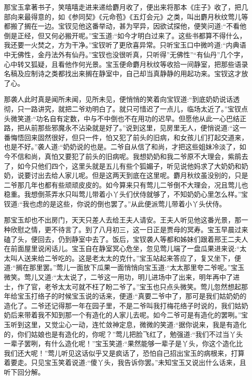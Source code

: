 \begin{parag}
    那宝玉拿著书子，笑嘻嘻走进来递给麝月收了，便出来将那本《庄子》收了，把几部向来最得意的，如《参同契》《元命苞》《五灯会元》之类，叫出麝月秋纹莺儿等都搬了搁在一边。宝钗见他这番举动，甚为罕异，因欲试探他，便笑问道:“不看他倒是正经，但又何必搬开呢。”宝玉道:“如今才明白过来了。这些书都算不得什么，我还要一火焚之，方为干净。”宝钗听了更欣喜异常。只听宝玉口中微吟道:“内典语中无佛性，金丹法外有仙丹。”宝钗也没很听真，只听得”无佛性”“有仙丹”几个字，心中转又狐疑，且看他作何光景。宝玉便命麝月秋纹等收拾一间静室，把那些语录名稿及应制诗之类都找出来搁在静室中，自己却当真静静的用起功来。宝钗这才放了心。
\end{parag}


\begin{parag}
    那袭人此时真是闻所未闻，见所未见，便悄悄的笑着向宝钗道:“到底奶奶说话透彻，只一路讲究，就把二爷劝明白了。就只可惜迟了一点儿，临场太近了。”宝钗点头微笑道:“功名自有定数，中与不中倒也不在用功的迟早。但愿他从此一心巴结正路，把从前那些邪魔永不沾染就是好了。”说到这里，见房里无人，便悄说道:“这一番悔悟回来固然很好，但只一件，怕又犯了前头的旧病，和女孩儿们打起交道来，也是不好。”袭人道:“奶奶说的也是。二爷自从信了和尚，才把这些姐妹冷淡了，如今不信和尚，真怕又要犯了前头的旧病呢。我想奶奶和我二爷原不大理会，紫鹃去了，如今只他们四个，这里头就是五儿有些个狐媚子，听见说他妈求了大奶奶和奶奶，说要讨出去给人家儿呢。但是这两天到底在这里呢。麝月秋纹虽没别的，只是二爷那几年也都有些顽顽皮皮的。如今算来只有莺儿二爷倒不大理会，况且莺儿也稳重。我想倒茶弄水只叫莺儿带着小丫头们伏侍就够了，不知奶奶心里怎么样。”宝钗道:“我也虑的是这些，你说的倒也罢了。”从此便派莺儿带着小丫头伏侍。
\end{parag}


\begin{parag}
    那宝玉却也不出房门，天天只差人去给王夫人请安。王夫人听见他这番光景，那一种欣慰之情，更不待言了。到了八月初三，这一日正是贾母的冥寿。宝玉早晨过来磕了头，便回去，仍到静室中去了。饭后，宝钗袭人等都和姊妹们跟着邢王二夫人在前面屋里说闲话儿。宝玉自在静室冥心危坐，忽见莺儿端了一盘瓜果进来说:“太太叫人送来给二爷吃的。这是老太太的克什。”宝玉站起来答应了，复又坐下，便道:“搁在那里罢。”莺儿一面放下瓜果一面悄悄向宝玉道:“太太那里夸二爷呢。”宝玉微笑。莺儿又道:“太太说了，二爷这一用功，明儿进场中了出来，明年再中了进士，作了官，老爷太太可就不枉了盼二爷了。”宝玉也只点头微笑。莺儿忽然想起那年给宝玉打络子的时候宝玉说的话来，便道:“真要二爷中了，那可是我们姑奶奶的造化了。二爷还记得那一年在园子里，不是二爷叫我打梅花络子时说的，我们姑奶奶后来带着我不知到那一个有造化的人家儿去呢。如今二爷可是有造化的罢咧。”宝玉听到这里，又觉尘心一动，连忙敛神定息，微微的笑道:“据你说来，我是有造化的，你们姑娘也是有造化的，你呢？”莺儿把脸飞红了，勉强道:“我们不过当丫头一辈子罢咧，有什么造化呢！”宝玉笑道:“果然能够一辈子是丫头，你这个造化比我们还大呢！”莺儿听见这话似乎又是疯话了，恐怕自己招出宝玉的病根来，打算着要走。只见宝玉笑着说道:“傻丫头，我告诉你罢。”未知宝玉又说出什么话来，且听下回分解。
\end{parag}